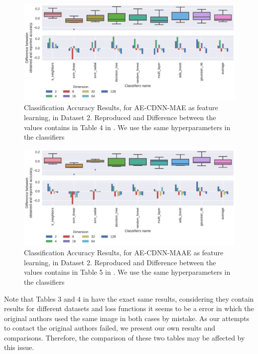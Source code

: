 



\begin{figure}[!ht]
  \centering
  \includegraphics[width=\linewidth]{figure/table_4.pdf}
  \caption{Classification Accuracy Results, for AE-CDNN-MAE as feature learning, in Dataset 2. Reproduced and Difference between the values contains in Table 4 in \cite{WenZha:2018}. We use the same hyperparameters in the classifiers}
\label{fig:acc-AE-CDNN-MAE-d2}
\end{figure}

\begin{figure}[!ht]
  \centering
  \includegraphics[width=\linewidth]{figure/table_5.pdf}
  \caption{Classification Accuracy Results, for AE-CDNN-MAAE as feature learning, in Dataset 2. Reproduced and Difference between the values contains in Table 5 in \cite{WenZha:2018}. We use the same hyperparameters in the classifiers}
\label{fig:acc-AE-CDNN-MAAE-d2}
\end{figure}

Note that Tables $3$ and $4$ in \cite{WenZha:2018} have the exact same results, considering they contain results for different datasets and loss functions it seems to be a error in which the original authors used the same image in both cases by mistake. As our attempts to contact the original authors failed, we present our own results and comparisons. Therefore, the comparison of these two tables may be affected by this issue.

